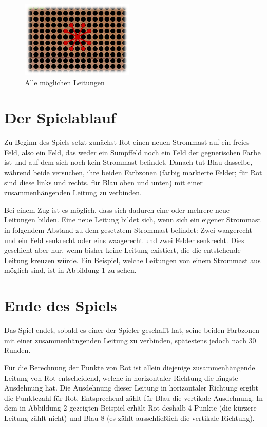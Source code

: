 \documentclass[a4paper, ngerman]{scrartcl}
\begin{document}
\begin{figure}
  \centering
  \includegraphics[width=0.48\textwidth]{bilder/setzzug.png}
  \caption{Alle möglichen Leitungen}\label{fig:Leitungen}
\end{figure}

\section{Der Spielablauf}
Zu Beginn des Spiels setzt zunächst Rot einen neuen Strommast auf ein
freies Feld, also ein Feld, das weder ein Sumpffeld noch ein Feld der
gegnerischen Farbe ist und auf dem sich noch kein Strommast befindet.
Danach tut Blau dasselbe, während beide versuchen,
ihre beiden Farbzonen (farbig markierte Felder; für Rot sind diese links und
rechts, für Blau  oben und unten) mit einer zusammenhängenden Leitung zu
verbinden.

Bei einem Zug ist es möglich, dass sich dadurch eine oder mehrere
neue Leitungen bilden. Eine neue Leitung bildet sich, wenn sich ein eigener
Strommast in folgendem Abstand zu dem gesetztem Strommast befindet: Zwei
waagerecht und ein Feld senkrecht oder eins waagerecht und zwei Felder
senkrecht. Dies geschieht aber nur, wenn bisher keine Leitung existiert, die
die entstehende Leitung kreuzen würde.
Ein Beispiel, welche Leitungen von einem Strommast aus möglich sind, ist
in Abbildung 1 zu sehen.


\section{Ende des Spiels}
Das Spiel endet, sobald es einer der Spieler geschafft hat, seine beiden
Farbzonen mit einer zusammenhängenden Leitung zu verbinden, spätestens jedoch
nach 30 Runden.

Für die Berechnung der Punkte von Rot ist allein diejenige zusammenhängende
Leitung von Rot entscheidend, welche in horizontaler Richtung die längste Ausdehnung
hat. Die Ausdehnung dieser Leitung in horizontaler Richtung ergibt die Punktezahl
für Rot. Entsprechend zählt für Blau die vertikale Ausdehnung.
In dem in Abbildung 2 gezeigten Beispiel erhält Rot deshalb 4 Punkte
(die kürzere Leitung zählt nicht) und Blau 8 (es zählt ausschließlich
die vertikale Richtung).
\end{document}
